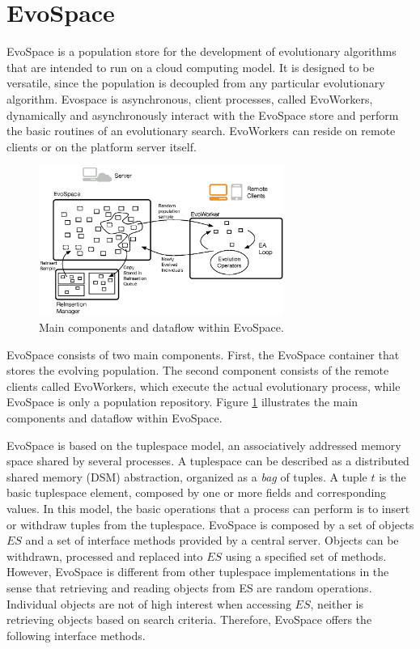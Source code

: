 \documentclass{llncs}
\begin{document}
\section{EvoSpace}
\label{sec:evospace}
EvoSpace is a population store for the development of evolutionary algorithms that are intended to run on a cloud computing model.
It is designed to be versatile, since the population is decoupled from any particular evolutionary algorithm.
Evospace is asynchronous, client processes, called EvoWorkers, dynamically and asynchronously interact with the EvoSpace store and perform the basic
routines of an evolutionary search.
EvoWorkers can reside on remote clients or on the platform server itself.

\begin{figure}[t]
    \centering
        \includegraphics[width=8cm]{evospaceExample.eps}
    \caption{Main components and dataflow within EvoSpace.}
    \label{fig:evo}
\end{figure}

EvoSpace consists of two main components.
First, the EvoSpace container that stores the evolving population.
The second component consists of the remote clients called EvoWorkers, which
execute the actual evolutionary process, while EvoSpace is only a population repository.
Figure \ref{fig:evo} illustrates the main components and dataflow within EvoSpace.

EvoSpace is based on the tuplespace model, an associatively addressed memory space shared by several processes.
A tuplespace can be described as a distributed shared memory (DSM) abstraction, organized as a \emph{bag} of tuples.
A tuple $t$ is the basic tuplespace element, composed by one or more fields and corresponding values.
In this model, the basic operations that a process can perform is to insert or withdraw tuples from the tuplespace.
EvoSpace is composed by a set of objects $ES$ and a set of interface methods provided by a central server.
Objects can be withdrawn, processed and replaced into $ES$ using a specified set of methods.
However, EvoSpace is different from other tuplespace implementations in the sense that retrieving and reading objects from ES are random operations.
Individual objects are not of high interest when accessing $ES$, neither is retrieving objects based on search criteria.
Therefore, EvoSpace offers the following interface methods.
\end{document}
